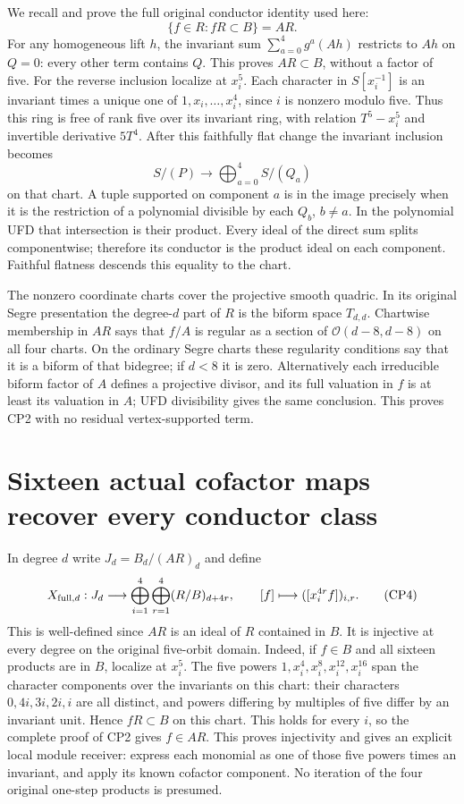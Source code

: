 We recall and prove the full original conductor identity used here:
\[
 \{f\in R:fR\subset B\}=AR.                                      \tag{CP2}
\]
For any homogeneous lift $h$, the invariant sum
$\sum_{a=0}^4g^a(Ah)$ restricts to $Ah$ on $Q=0$: every other
term contains $Q$. This proves $AR\subset B$, without a factor
of five. For the reverse inclusion localize at $x_i^5$. Each
character in $S[x_i^{-1}]$ is an invariant times a unique one
of $1,x_i,\ldots,x_i^4$, since $i$ is nonzero modulo five.
Thus this ring is free of rank five over its invariant ring,
with relation $T^5-x_i^5$ and invertible derivative $5T^4$.
After this faithfully flat change the invariant inclusion becomes
\[
 S/(P)\longrightarrow\bigoplus_{a=0}^4 S/(Q_a)                    \tag{CP3}
\]
on that chart. A tuple supported on component $a$ is in the image
precisely when it is the restriction of a polynomial divisible by
each $Q_b$, $b\ne a$. In the polynomial UFD that intersection
is their product. Every ideal of the direct sum splits componentwise;
therefore its conductor is the product ideal on each component.
Faithful flatness descends this equality to the chart.

The nonzero coordinate charts cover the projective smooth quadric.
In its original Segre presentation the degree-$d$ part of $R$ is
the biform space $T_{d,d}$. Chartwise membership in $AR$ says
that $f/A$ is regular as a section of
$\mathcal O(d-8,d-8)$ on all four charts. On the ordinary Segre
charts these regularity conditions say that it is a biform of that
bidegree; if $d<8$ it is zero. Alternatively each irreducible
biform factor of $A$ defines a projective divisor, and its full
valuation in $f$ is at least its valuation in $A$; UFD divisibility
gives the same conclusion. This proves CP2 with no residual
vertex-supported term.

\section{Sixteen actual cofactor maps recover every conductor class}
In degree $d$ write $J_d=B_d/(AR)_d$ and define
\[
 X_{{\rm full},d}:J_d\longrightarrow
       \bigoplus_{i=1}^4\bigoplus_{r=1}^4(R/B)_{d+4r},\qquad
 [f]\longmapsto([x_i^{4r}f])_{i,r}.                                \tag{CP4}
\]
This is well-defined since $AR$ is an ideal of $R$ contained in $B$.
It is injective at every degree on the original five-orbit domain.
Indeed, if $f\in B$ and all sixteen products are in $B$, localize
at $x_i^5$. The five powers $1,x_i^4,x_i^8,x_i^{12},x_i^{16}$
span the character components over the invariants on this chart:
their characters $0,4i,3i,2i,i$ are all distinct, and powers differing
by multiples of five differ by an invariant unit. Hence $fR\subset B$
on this chart. This holds for every $i$, so the complete proof of
CP2 gives $f\in AR$. This proves injectivity and gives an explicit
local module receiver: express each monomial as one of those five
powers times an invariant, and apply its known cofactor component.
No iteration of the four original one-step products is presumed.

